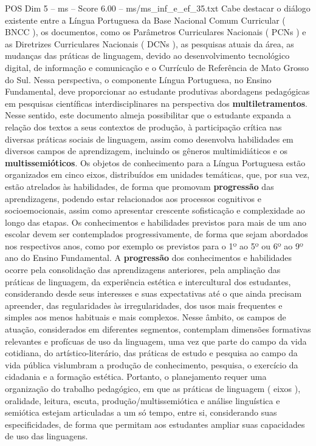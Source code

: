 \begin{textsample}{POS Dim 5 – ms – Score 6.00 – ms/ms\_inf\_e\_ef\_35.txt}
Cabe destacar o diálogo existente entre a Língua Portuguesa da Base Nacional Comum Curricular ( BNCC ), os documentos, como os Parâmetros Curriculares Nacionais ( PCNs ) e as Diretrizes Curriculares Nacionais ( DCNs ), as pesquisas atuais da área, as mudanças das práticas de linguagem, devido ao desenvolvimento tecnológico digital, de informação e comunicação e o Currículo de Referência de Mato Grosso do Sul.
Nessa perspectiva, o componente Língua Portuguesa, no Ensino Fundamental, deve proporcionar ao estudante produtivas abordagens pedagógicas em pesquisas científicas interdisciplinares na perspectiva dos \textbf{multiletramentos}.
Nesse sentido, este documento almeja possibilitar que o estudante expanda a relação dos textos a seus contextos de produção, à participação crítica nas diversas práticas sociais de linguagem, assim como desenvolva habilidades em diversos campos de aprendizagem, incluindo os gêneros multimidiáticos e os \textbf{multissemióticos}.
Os objetos de conhecimento para a Língua Portuguesa estão organizados em cinco eixos, distribuídos em unidades temáticas, que, por sua vez, estão atrelados às habilidades, de forma que promovam \textbf{progressão} das aprendizagens, podendo estar relacionados aos processos cognitivos e socioemocionais, assim como apresentar crescente sofisticação e complexidade ao longo das etapas.
Os conhecimentos e habilidades previstos para mais de um ano escolar devem ser contemplados progressivamente, de forma que sejam abordados nos respectivos anos, como por exemplo os previstos para o 1º ao 5º ou 6º ao 9º ano do Ensino Fundamental.
A \textbf{progressão} dos conhecimentos e habilidades ocorre pela consolidação das aprendizagens anteriores, pela ampliação das práticas de linguagem, da experiência estética e intercultural dos estudantes, considerando desde seus interesses e suas expectativas até o que ainda precisam apreender, das regularidades às irregularidades, dos usos mais frequentes e simples aos menos habituais e mais complexos.
Nesse âmbito, os campos de atuação, considerados em diferentes segmentos, contemplam dimensões formativas relevantes e profícuas de uso da linguagem, uma vez que parte do campo da vida cotidiana, do artístico-literário, das práticas de estudo e pesquisa ao campo da vida pública vislumbram a produção de conhecimento, pesquisa, o exercício da cidadania e a formação estética.
Portanto, o planejamento requer uma organização do trabalho pedagógico, em que as práticas de linguagem ( eixos ), oralidade, leitura, escuta, produção/multissemiótica e análise linguística e semiótica estejam articuladas a um só tempo, entre si, considerando suas especificidades, de forma que permitam aos estudantes ampliar suas capacidades de uso das linguagens.

\end{textsample}
